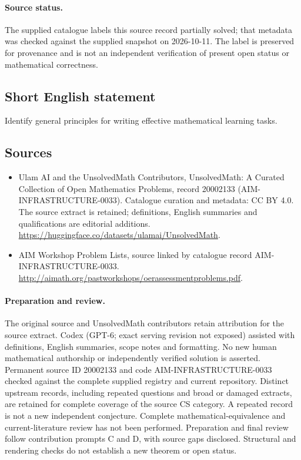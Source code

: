 \documentclass[11pt]{article}
\begin{document}
\paragraph{Source status.}
The supplied catalogue labels this source record partially solved; that metadata was checked against the supplied snapshot on 2026-10-11. The label is preserved for provenance and is not an independent verification of present open status or mathematical correctness.
\subsection{Short English statement}
Identify general principles for writing effective mathematical learning tasks.
\subsection{Sources}
\begin{itemize}
\item[\hypertarget{source:20002133:1}{S1}] Ulam AI and the UnsolvedMath Contributors, UnsolvedMath: A Curated Collection of Open Mathematics Problems, record 20002133 (AIM-INFRASTRUCTURE-0033). Catalogue curation and metadata: CC BY 4.0. The source extract is retained; definitions, English summaries and qualifications are editorial additions.
\url{https://huggingface.co/datasets/ulamai/UnsolvedMath}.
\item[\hypertarget{source:20002133:2}{S2}] AIM Workshop Problem Lists, source linked by catalogue record AIM-INFRASTRUCTURE-0033.
\url{http://aimath.org/pastworkshops/oerassessmentproblems.pdf}.
\end{itemize}
\paragraph{Preparation and review.}
The original source and UnsolvedMath contributors retain attribution for the source extract. Codex (GPT-6; exact serving revision not exposed) assisted with definitions, English summaries, scope notes and formatting. No new human mathematical authorship or independently verified solution is asserted. Permanent source ID 20002133 and code AIM-INFRASTRUCTURE-0033 checked against the complete supplied registry and current repository. Distinct upstream records, including repeated questions and broad or damaged extracts, are retained for complete coverage of the source CS category. A repeated record is not a new independent conjecture. Complete mathematical-equivalence and current-literature review has not been performed. Preparation and final review follow contribution prompts C and D, with source gaps disclosed. Structural and rendering checks do not establish a new theorem or open status.
\label{end:20002133}
\end{document}

